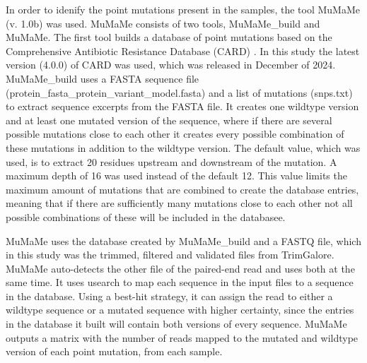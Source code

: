 In order to idenify the point mutations present in the samples, the tool MuMaMe (v. 1.0b)\cite{magesh2019MumameSoftwareTool} was used. MuMaMe consists of two tools, MuMaMe\_build and MuMaMe. 
The first tool builds a database of point mutations based on the Comprehensive Antibiotic Resistance Database (CARD) \cite{alcock2023CARD2023Expanded}. In this study the latest version (4.0.0) of CARD was used, which was released in December of 2024.
MuMaMe\_build uses a FASTA sequence file (protein\_fasta\_protein\_variant\_model.fasta) and a list of mutations (snps.txt) to extract sequence excerpts from the FASTA file. It creates one wildtype version and at least one mutated version of the sequence, where if there are several possible mutations close to each other it creates every possible combination of these mutations in addition to the wildtype version. 
The default value, which was used, is to extract 20 residues upstream and downstream of the mutation. 
A maximum depth of 16 was used instead of the default 12. This value limits the maximum amount of mutations that are combined to create the database entries, 
meaning that if there are sufficiently many mutations close to each other not all possible combinations of these will be included in the databasee.

MuMaMe uses the database created by MuMaMe\_build and a FASTQ file, which in this study was the trimmed, filtered and validated files from TrimGalore. MuMaMe auto-detects the other file of the paired-end read and uses both at the same time. It uses usearch\cite{edgar2010SearchClusteringOrders} to map each sequence in the input files to a sequence in the database. Using a best-hit strategy, it can assign the read to either a wildtype sequence or a mutated sequence with higher certainty, since the entries in the database it built will contain both versions of every sequence. 
MuMaMe outputs a matrix with the number of reads mapped to the mutated and wildtype version of each point mutation, from each sample.

% 

